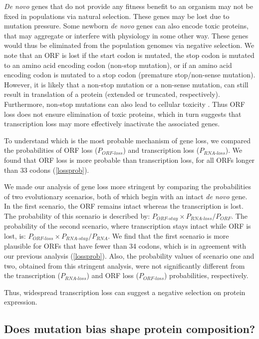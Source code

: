 \documentclass[12pt,a4paper]{article}
\begin{document}
\textit{De novo} genes that do not provide any fitness benefit to an organism may not be fixed in populations via natural selection. These genes may be lost due to mutation pressure. Some newborn \textit{de novo} genes can also encode toxic proteins, that may aggregate or interfere with physiology in some other way. These genes would thus be eliminated from the population genomes via negative selection. We note that an ORF is lost if the start codon is mutated, the stop codon is mutated to an amino acid encoding codon (non-stop mutation), or if an amino acid encoding codon is mutated to a stop codon (premature stop/non-sense mutation). However, it is likely that a non-stop mutation or a non-sense mutation, can still result in translation of a protein (extended or truncated, respectively). Furthermore, non-stop mutations can also lead to cellular toxicity \citep{nonstop}. Thus ORF loss does not ensure elimination of toxic proteins, which in turn suggests that transcription loss may more effectively inactivate the associated genes.

To understand which is the most probable mechanism of gene loss, we compared the probabilities of ORF loss ($P_\textit{ORF-loss}$) and transcription loss ($P_\textit{RNA-loss}$). We found that ORF loss is more probable than transcription loss, for all ORFs longer than 33 codons (\autoref{lossprob}).

We made our analysis of gene loss more stringent by comparing the probabilities of two evolutionary scenarios, both of which begin with an intact \textit{de novo} gene. In the first scenario, the ORF remains intact whereas the transcription is lost. The probability of this scenario is described by: 
$P_\textit{ORF-stay} \times P_\textit{RNA-loss}/P_\textit{ORF}$. The probability of the second scenario, where transcription stays intact while ORF is lost, is: $P_\textit{ORF-loss} \times P_\textit{RNA-stay}/P_\textit{RNA}$. We find that the first scenario is more plausible for ORFs that have fewer than 34 codons, which is in agreement with our previous analysis (\autoref{lossprob}). Also, the probability values of scenario one and two, obtained from this stringent analysis, were not significantly different from the transcription ($P_\textit{RNA-loss}$) and ORF loss ($P_\textit{ORF-loss}$) probabilities, respectively. 

Thus, widespread transcription loss can suggest a negative selection on protein expression.


\subsection{Does mutation bias shape protein composition?}
\end{document}

